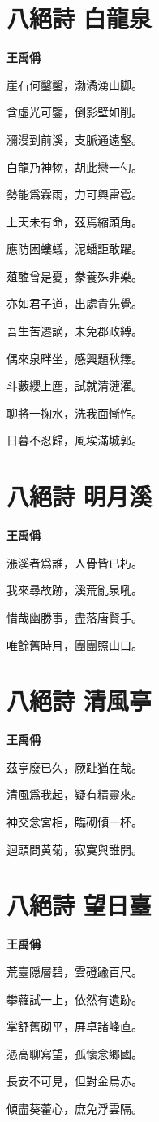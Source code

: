 \documentclass[12pt,a4paper]{ctexbook}
\begin{document}
\section{八絕詩 白龍泉}
\textbf{王禹偁}\par\vspace{0.5em}
崖石何鑿鑿，渤潏湧山脚。\par
含虛光可鑒，倒影壁如削。\par
瀰漫到前溪，支脈通遠壑。\par
白龍乃神物，胡此戀一勺。\par
勢能爲霖雨，力可興雷雹。\par
上天未有命，茲焉縮頭角。\par
應防困螻蟻，泥蟠詎敢躍。\par
葅醢曾是憂，豢養殊非樂。\par
亦如君子道，出處貴先覺。\par
吾生苦遷謫，未免郡政縛。\par
偶來泉畔坐，感興題秋籜。\par
斗藪纓上塵，試就清漣濯。\par
聊將一掬水，洗我面慚怍。\par
日暮不忍歸，風埃滿城郭。\par

\section{八絕詩 明月溪}
\textbf{王禹偁}\par\vspace{0.5em}
漲溪者爲誰，人骨皆已朽。\par
我來尋故跡，溪荒亂泉吼。\par
惜哉幽勝事，盡落唐賢手。\par
唯餘舊時月，團團照山口。\par

\section{八絕詩 清風亭}
\textbf{王禹偁}\par\vspace{0.5em}
茲亭廢已久，厥趾猶在哉。\par
清風爲我起，疑有精靈來。\par
神交念宮相，臨砌傾一杯。\par
迴頭問黄菊，寂寞與誰開。\par

\section{八絕詩 望日臺}
\textbf{王禹偁}\par\vspace{0.5em}
荒臺隠層碧，雲磴踰百尺。\par
攀蘿試一上，依然有遺跡。\par
掌舒舊砌平，屏卓諸峰直。\par
憑高聊寫望，孤懷念鄉國。\par
長安不可見，但對金烏赤。\par
傾盡葵藿心，庶免浮雲隔。\par
\end{document}
